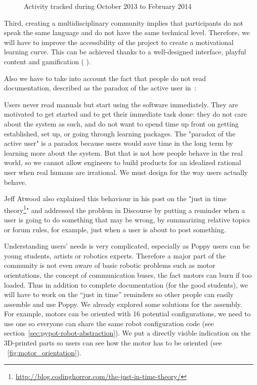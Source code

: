 \begin{figure}[tb]
\centering
    \hfil
    \caption{Activity tracked during October 2013 to February 2014}
    \label{fig:poppy_community}
\end{figure}


Third, creating a multidisciplinary community implies that participants do not speak the same language and do not have the same technical level. Therefore, we will have to improve the accessibility of the project to create a motivational learning curve. This can be achieved thanks to a well-designed interface, playful content and gamification (\cite{deterding2011game} \cite{groh2012gamification}).

Also we have to take into account the fact that people do not read documentation, described as the paradox of the active user in~\parencite{carroll1987paradox}:
\begin{formal}
    Users never read manuals but start using the software immediately. They are motivated to get started and to get their immediate task done: they do not care about the system as such, and do not want to spend time up front on getting established, set up, or going through learning packages.
    The "paradox of the active user" is a paradox because users would save time in the long term by learning more about the system. But that is not how people behave in the real world, so we cannot allow engineers to build products for an idealized rational user when real humans are irrational. We must design for the way users actually behave.
\end{formal}

Jeff Atwood also explained this behaviour in his post on the "just in time theory\footnote{\url{http://blog.codinghorror.com/the-just-in-time-theory/}}" and addressed the problem in Discourse by putting a reminder when a user is going to do something that may be wrong, by summarizing relative topics or forum rules, for example, just when a user is about to post something.

Understanding users’ needs is very complicated, especially as Poppy users can be young students, artists or robotics experts. Therefore a major part of the community is not even aware of basic robotic problems such as motor orientations, the concept of communication buses, the fact motors can burn if too loaded. Thus in addition to complete documentation (for the good students), we will have to work on the “just in time” reminders so other people can easily assemble and use Poppy.
We already explored some solutions for the assembly. For example, motors can be oriented with 16 potential configurations, we need to use one so everyone can share the same robot configuration code (see section~\ref{sec:pypot-robot-abstraction}). We put a directly visible indication on the 3D-printed parts so users can see how the motor has to be oriented (see \figurename~\ref{fig:motor_orientation}).

